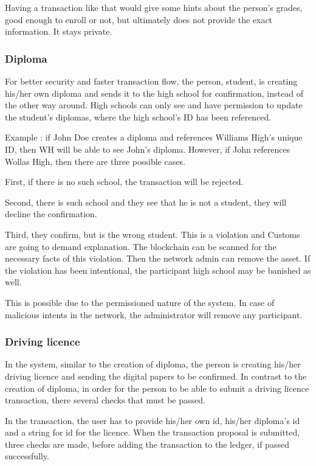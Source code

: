\documentclass[a4paper,11pt]{report}
\begin{document}
	Having a transaction like that would give some hints about the person’s grades, good enough to enroll or not, but ultimately does not provide the exact information. It stays private. 

\subsubsection{Diploma}
	For better security and faster transaction flow, the person, student, is creating his/her own diploma and sends it to the high school for confirmation, instead of the other way around. High schools can only see and have permission to update the student’s diplomas, where the high school’s ID has been referenced.
	
	Example : if John Doe creates a diploma and references Williams High’s unique ID, then WH will be able to see John's diploma. However, if John references Wollas High, then there are three possible cases. 
	
	First, if there is no such school, the transaction will be rejected. 

	Second, there is such school and they see that he is not a student, they will decline the confirmation.

	Third, they confirm, but is the wrong student. This is a violation and Customs are going to demand explanation. The blockchain can be scanned for the necessary facts of this violation. Then the network admin can remove the asset. If the violation has been intentional, the participant high school may be banished as well.

	This is possible due to the permissioned nature of the system. In case of malicious intents in the network, the administrator will remove any participant. 

\subsubsection{Driving licence}

	In the system, similar to the creation of diploma, the person is creating his/her driving licence and sending the digital papers to be confirmed. In contrast to the creation of diploma, in order for the person to be able to submit a driving licence transaction, there several checks that must be passed. 
	
	In the transaction, the user has to provide his/her own id, his/her diploma’s id and a string for id for the licence. When the transaction proposal is submitted, three checks are made, before adding the transaction to the ledger, if passed successfully. 
\end{document}
